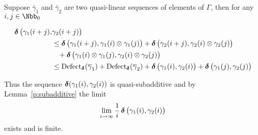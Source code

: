 \begin{Proof} 
  Suppose $\bar\gamma_{1}$ and $\bar\gamma_{2}$ are two quasi-linear
  sequences of elements of $\Gamma$, then for any $i,j\in\Nbb_{0}$

  \begin{align*}
    \operatorname{{\bm\delta}}\big(\gamma_{1}(i+j),&\gamma_{2}(i+j)\big)
    \\
    &\leq
    \operatorname{{\bm\delta}}\big(\gamma_{1}(i+j),\gamma_{1}(i)\otimes\gamma_{1}(j)\big) +
    \operatorname{{\bm\delta}}\big(\gamma_{2}(i+j),\gamma_{2}(i)\otimes\gamma_{2}(j)\big) \\
    &\;\;\;+
    \operatorname{{\bm\delta}}\big(\gamma_{1}(i)\otimes\gamma_{1}(j),
            \gamma_{2}(i)\otimes\gamma_{2}(j)\big)\\
            &\leq
            \operatorname{\mathrm{Defect}}_{\operatorname{{\bm\delta}}}(\overline\gamma_{1}) +
            \operatorname{\mathrm{Defect}}_{\operatorname{{\bm\delta}}}(\overline\gamma_{2}) +
            \operatorname{{\bm\delta}}\big(\gamma_{1}(i),\gamma_{2}(i)\big) +
            \operatorname{{\bm\delta}}\big(\gamma_{1}(j),\gamma_{2}(j)\big)
  \end{align*}
  
  Thus the sequence $\operatorname{{\bm\delta}}(\gamma_{1}(i),\gamma_{2}(i))$ is
  quasi-subadditive and by Lemma~\ref{p:subadditive} the limit 
  \[
  \lim_{i\stackrel{}{\rightarrow}\infty} \frac1i \operatorname{{\bm\delta}}\big(\gamma_{1}(i),\gamma_{2}(i)\big)
  \]
  exists and is finite.
\end{Proof}

